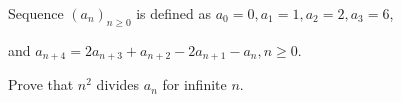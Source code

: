 Sequence $(a_n)_{n\geq 0}$ is defined as $a_{0}=0, a_1=1, a_2=2, a_3=6$, 

and  $ a_{n+4}=2a_{n+3}+a_{n+2}-2a_{n+1}-a_n, n\geq 0$.

Prove that  $n^2$ divides $a_n$ for infinite $n$.
